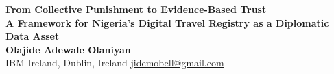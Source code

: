 \documentclass[11pt]{article}
\begin{document}
\begin{center}
    \vspace*{0.3cm}
    {\color{primary-blue}\LARGE\textbf{From Collective Punishment to Evidence-Based Trust}}\\[8pt]
    {\color{primary-blue}\large\textbf{A Framework for Nigeria's Digital Travel Registry as a Diplomatic Data Asset}}\\[14pt]
    {\color{dark-grey}\normalsize\textbf{Olajide Adewale Olaniyan}}\\[3pt]
    {\color{dark-grey}\small IBM Ireland, Dublin, Ireland \quad\textbar\quad
     \href{mailto:jidemobell@gmail.com}{jidemobell@gmail.com}}\\[10pt]
    \vspace{0.3cm}
\end{center}
\end{document}
